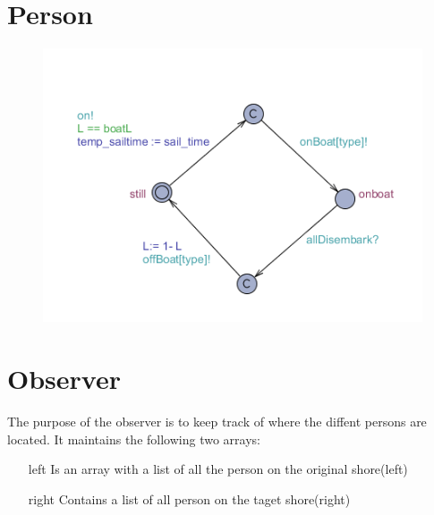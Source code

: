 \section{Person}
\begin{figure}%
\includegraphics[width=\columnwidth]{pictures/person.png}%
\caption{}%
\label{}%
\end{figure}



















\section{Observer}
The purpose of the observer is to keep track of where the diffent persons are located. It maintains the following two arrays:
\begin{itemize}
	\item[left] Is an array with a list of all the person on the original shore(left)
	\item[right] Contains a list of all person on the taget shore(right)
\end{itemize}

